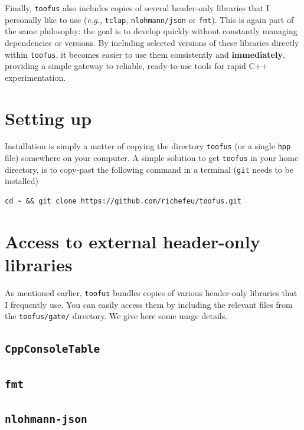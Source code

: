 \documentclass[a4paper,onecolumn,11pt]{doofus}
\begin{document}
Finally, \texttt{toofus} also includes copies of several header-only libraries that I personally like to use (\textit{e.g.}, \texttt{tclap}, \texttt{nlohmann/json} or \texttt{fmt}). This is again part of the same philosophy: the goal is to develop quickly without constantly managing dependencies or versions. By including selected versions of these libraries directly within \texttt{toofus}, it becomes easier to use them consistently and \textbf{immediately}, providing a simple gateway to reliable, ready-to-use tools for rapid C++ experimentation.




\section{Setting up}



Installation is simply a matter of copying the directory \texttt{toofus} (or a single \texttt{hpp} file) somewhere on your computer.
A simple solution to get \texttt{toofus} in your home directory, is to copy-past the following command in a terminal (\texttt{git} needs to be installed)
%
\begin{lstlisting}
cd ~ && git clone https://github.com/richefeu/toofus.git
\end{lstlisting}

\section{Access to external header-only libraries}

As mentioned earlier, \texttt{toofus} bundles copies of various header-only libraries that I frequently use. You can easily access them by including the relevant files from the \texttt{toofus/gate/} directory.
We give here some usage details.


\subsection{\texttt{CppConsoleTable}}

\subsection{\texttt{fmt}}

\subsection{\texttt{nlohmann-json}}
\end{document}
